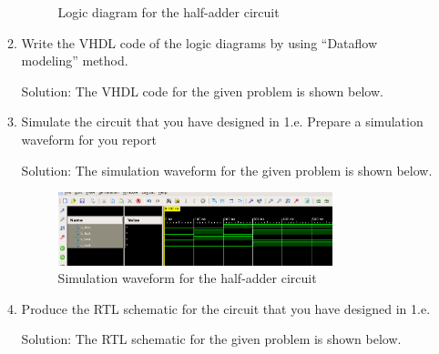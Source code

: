 \documentclass[table]{article}
\begin{document}
\begin{enumerate}
\begin{enumerate}[label=(\alph*)]
\begin{figure}[H]
\begin{tikzpicture}[scale=1.5]
            \end{tikzpicture}
            \caption{Logic diagram for the half-adder circuit }
        \end{figure}
        
        \item Write the VHDL code of the logic diagrams by using “Dataflow modeling” method.
        
        Solution: The VHDL code for the given problem is shown below.

        \begin{center} %
            \lstset{
          caption= half\_adder.vhd, 
          basicstyle=\footnotesize, frame=tb,
          xleftmargin=.2\textwidth, xrightmargin=.2\textwidth
        }
            
        
        \end{center}


        \item Simulate the circuit that you have designed in 1.e. Prepare a simulation waveform for you
        report

        Solution: The simulation waveform for the given problem is shown below.

        \begin{figure}[H]
            \centering
            \includegraphics[width=0.8\textwidth]{ha_sim.png}
            \caption{Simulation waveform for the half-adder circuit}
            \label{fig:halfAdder}
        \end{figure}

        \item Produce the RTL schematic for the circuit that you have designed in 1.e.
        
        Solution: The RTL schematic for the given problem is shown below.


\end{enumerate}
\end{enumerate}
\end{document}
